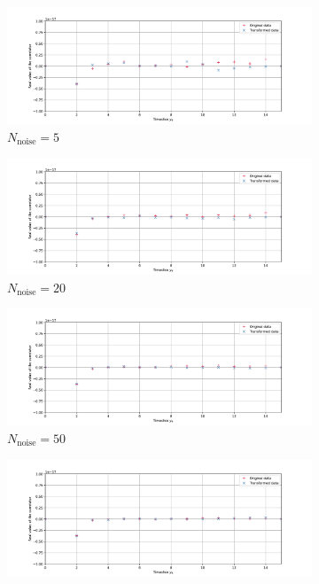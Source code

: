 \documentclass[english, LaM, oneside, noexaminfo]{sapthesis}
\begin{document}
\begin{figure}[h!]
    \centering
    \begin{subfigure}[b]{0.49\textwidth}
        \centering
        \includegraphics[width=\textwidth]{imgs-MSc-thesis/check2-5.pdf}
        \caption{$N_\text{noise}=5$}
    \end{subfigure}
    \begin{subfigure}[b]{0.49\textwidth}
        \centering
        \includegraphics[width=\textwidth]{imgs-MSc-thesis/check2-20.pdf}
        \caption{$N_\text{noise}=20$}
    \end{subfigure}
    \begin{subfigure}[b]{0.49\textwidth}
        \centering
        \includegraphics[width=\textwidth]{imgs-MSc-thesis/check2-50.pdf}
        \caption{$N_\text{noise}=50$}
    \end{subfigure}
    \begin{subfigure}[b]{0.49\textwidth}
        \centering
        \includegraphics[width=\textwidth]{imgs-MSc-thesis/check2-100.pdf}

\end{subfigure}
\end{figure}
\end{document}
